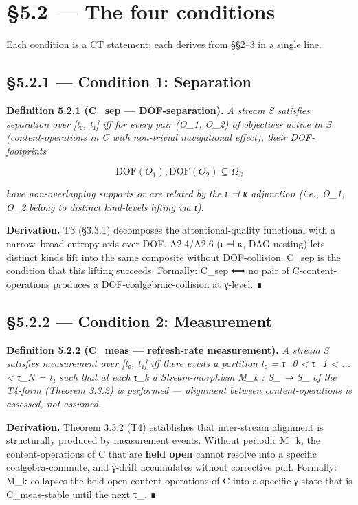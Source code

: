 \documentclass[11pt, openany]{book}
\newcommand{\sectionbreak}{\clearpage}
\begin{document}
\sectionbreak

\section{§5.2 --- The four conditions}

Each condition is a CT statement; each derives from §§2–3 in a single line.

\subsection{§5.2.1 --- Condition 1: Separation}

\textbf{Definition 5.2.1 (C\_\allowbreak{}sep --- DOF-separation).} \textit{A stream S satisfies separation over [t₀, t₁] iff for every pair (O\_\allowbreak{}1, O\_\allowbreak{}2) of objectives active in S (content-operations in C with non-trivial navigational effect), their DOF-footprints}

\[
\mathrm{DOF}(O_1), \mathrm{DOF}(O_2) \subseteq \Omega_S
\]

\textit{have non-overlapping supports or are related by the ι ⊣ κ adjunction (i.e., O\_\allowbreak{}1, O\_\allowbreak{}2 belong to distinct kind-levels lifting via ι).}

\textbf{Derivation.} T3 (§3.3.1) decomposes the attentional-quality functional with a narrow–broad entropy axis over DOF. A2.4/A2.6 (ι ⊣ κ, DAG-nesting) lets distinct kinds lift into the same composite without DOF-collision. C\_\allowbreak{}sep is the condition that this lifting succeeds. Formally: C\_\allowbreak{}sep ⟺ no pair of C-content-operations produces a DOF-coalgebraic-collision at γ-level. ∎

\subsection{§5.2.2 --- Condition 2: Measurement}

\textbf{Definition 5.2.2 (C\_\allowbreak{}meas --- refresh-rate measurement).} \textit{A stream S satisfies measurement over [t₀, t₁] iff there exists a partition t₀ = τ\_\allowbreak{}0 < τ\_\allowbreak{}1 < ... < τ\_\allowbreak{}N = t₁ such that at each τ\_\allowbreak{}k a Stream-morphism M\_\allowbreak{}k : S\_ → S\_ of the T4-form (Theorem 3.3.2) is performed --- alignment between content-operations is assessed, not assumed.}

\textbf{Derivation.} Theorem 3.3.2 (T4) establishes that inter-stream alignment is structurally produced by measurement events. Without periodic M\_\allowbreak{}k, the content-operations of C that are \textbf{held open} cannot resolve into a specific coalgebra-commute, and γ-drift accumulates without corrective pull. Formally: M\_\allowbreak{}k collapses the held-open content-operations of C into a specific γ-state that is C\_\allowbreak{}meas-stable until the next τ\_. ∎
\end{document}
